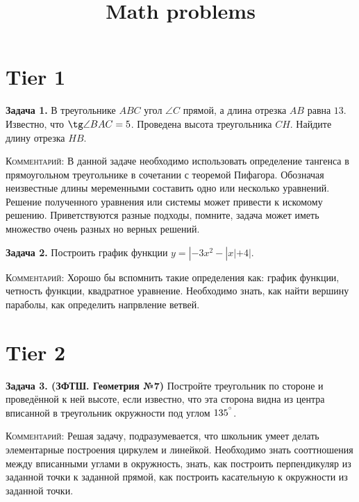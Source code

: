 \documentclass{article}
\title{Math problems}
\begin{document}
\maketitle
\section*{Tier 1}
\textbf{Задача 1.}
В треугольнике $ABC$ угол $\angle C$ прямой, а длина отрезка $AB$ равна $13$. Известно, что $\tg \angle BAC  = 5$. Проведена высота треугольника $CH$. Найдите длину отрезка $HB$.

\textsc{Комментарий: }
В данной задаче необходимо использовать определение тангенса в прямоугольном треугольнике в сочетании с теоремой Пифагора. Обозначая неизвестные длины меременными составить одно или несколько уравнений. Решение полученного уравнения или системы может привести к искомому решению. Приветствуются разные подходы, помните, задача может иметь множество очень разных но верных решений.


\textbf{Задача 2.}
Построить график функции $y = |-3x^2 - |x| + 4|$.

\textsc{Комментарий: }
Хорошо бы вспомнить такие определения как: график функции, четность функции, квадратное уравнение. Необходимо знать, как найти вершину параболы, как определить напрвление ветвей. 
\section*{Tier 2}
\textbf{Задача 3. (ЗФТШ. Геометрия №7)}
Постройте треугольник по стороне и проведённой к ней высоте, если известно, что эта сторона видна из центра вписанной в треугольник окружности под углом $135^{\degree}$.

\textsc{Комментарий: }
Решая задачу, подразумевается, что школьник умеет делать элементарные построения циркулем и линейкой. Необходимо знать сооттношения между вписанными углами в окружность, знать, как построить перпендикуляр из заданной точки к заданной прямой, как построить касательную к окружности из заданной точки.
\end{document}
